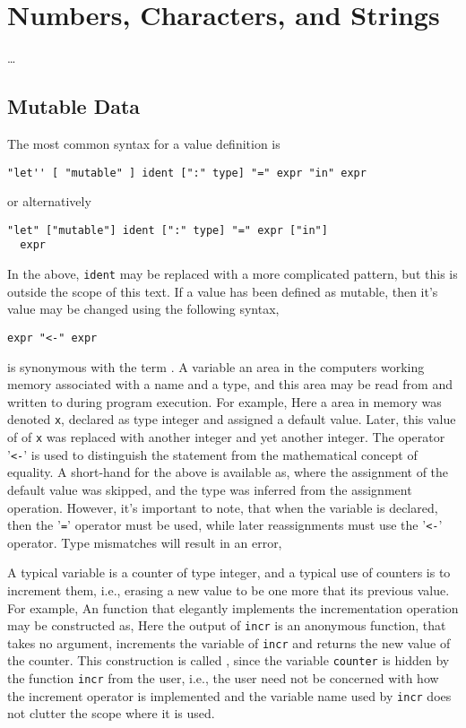 \chapter{Numbers, Characters, and Strings}

\dots

\section{Mutable Data}
The most common syntax for a value definition is
\begin{lstlisting}[language=EBNF]
"let'' [ "mutable" ] ident [":" type] "=" expr "in" expr
\end{lstlisting}
or alternatively
\begin{lstlisting}[language=EBNF]
"let" ["mutable"] ident [":" type] "=" expr ["in"]
  expr
\end{lstlisting}
In the above, \texttt{ident} may be replaced with a more complicated pattern, but this is outside the scope of this text. If a value has been defined as mutable, then it's value may be changed using the following syntax,
\begin{lstlisting}[language=EBNF]
expr "<-" expr
\end{lstlisting}

 is synonymous with the term . A variable an area in the computers working memory associated with a name and a type, and this area may be read from and written to during program execution. For example,
Here a area in memory was denoted \texttt{x}, declared as type integer and assigned a default value.  Later, this value of of \texttt{x} was replaced with another integer and yet another integer. The operator '\verb|<-|' is used to distinguish the statement from the mathematical concept of equality. A short-hand for the above is available as,
where the assignment of the default value was skipped, and the type was inferred from the assignment operation. However, it's important to note, that when the variable is declared, then the '\verb|=|' operator must be used, while later reassignments must use the '\verb|<-|'  operator. Type mismatches will result in an error, 

A typical variable is a counter of type integer, and a typical use of counters is to increment them, i.e., erasing a new value to be one more that its previous value. For example,
An function that elegantly implements the incrementation operation may be constructed as,
 Here the output of \texttt{incr} is an anonymous function, that takes no argument, increments the variable of \texttt{incr} and returns the new value of the counter. This construction is called , since the variable \texttt{counter} is hidden by the function \texttt{incr} from the user, i.e., the user need not be concerned with how the increment operator is implemented and the variable name used by \texttt{incr} does not clutter the scope where it is used.

